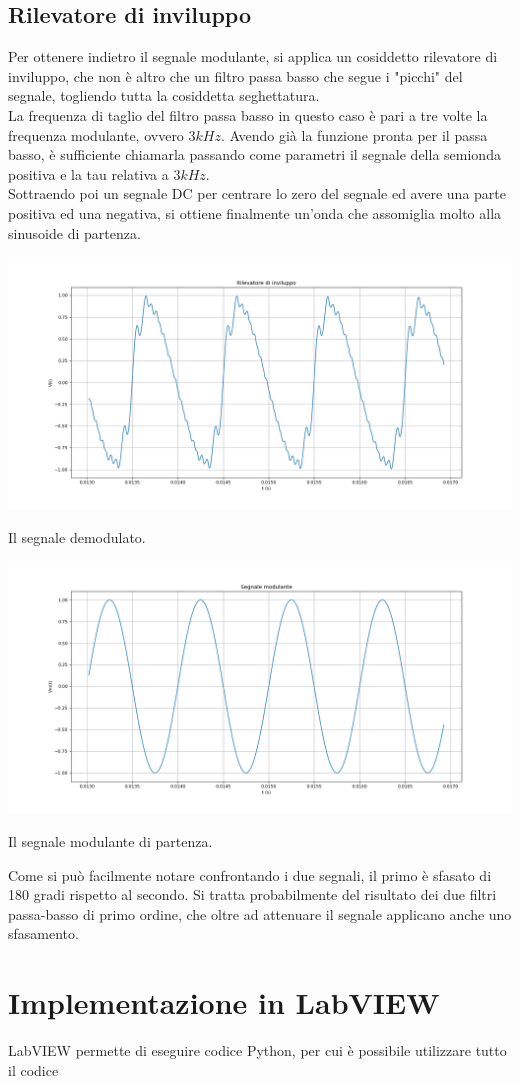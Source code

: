 \documentclass{article}
\begin{document}
\subsection{Rilevatore di inviluppo}
Per ottenere indietro il segnale modulante, si applica un cosiddetto rilevatore di inviluppo, che non è altro che un filtro
passa basso che segue i "picchi" del segnale, togliendo tutta la cosiddetta seghettatura.
\\
La frequenza di taglio del filtro passa basso in questo caso è pari a tre volte la frequenza modulante, ovvero $3 kHz$.
Avendo già la funzione pronta per il passa basso, è sufficiente chiamarla passando come parametri il segnale della semionda
positiva e la tau relativa a $3 kHz$.
\\
Sottraendo poi un segnale DC per centrare lo zero del segnale ed avere una parte positiva ed una negativa, si ottiene finalmente
un'onda che assomiglia molto alla sinusoide di partenza.

\begin{center}
    \includegraphics[width=\textwidth]{inviluppo.png}
\end{center}
Il segnale demodulato.

\begin{center}
    \includegraphics[width=\textwidth]{modulante.png}
\end{center}
Il segnale modulante di partenza.

Come si può facilmente notare confrontando i due segnali, il primo è sfasato di 180 gradi rispetto al secondo.
Si tratta probabilmente del risultato dei due filtri passa-basso di primo ordine, che oltre ad attenuare il segnale
applicano anche uno sfasamento.

\section{Implementazione in LabVIEW}
LabVIEW permette di eseguire codice Python, per cui è possibile utilizzare tutto il codice 
\end{document}
